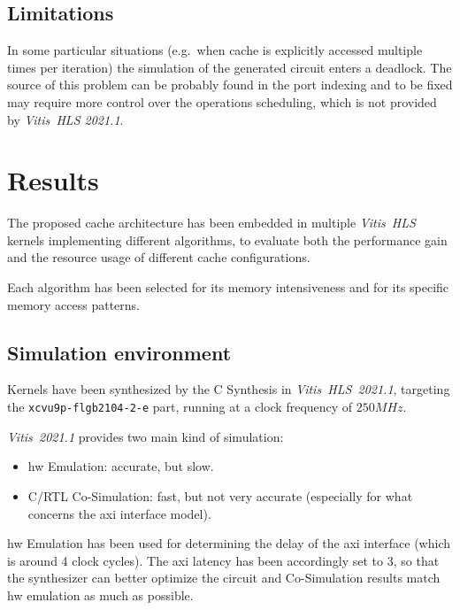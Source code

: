 \documentclass[11pt,a4paper,oneside]{memoir}
\begin{document}
\section{Limitations}
In some particular situations (e.g.\ when cache is explicitly accessed multiple
times per iteration) the simulation of the generated circuit enters a deadlock.
The source of this problem can be probably found in the port indexing and to be
fixed may require more control over the operations scheduling, which is not
provided by \emph{Vitis\texttrademark~HLS 2021.1}.

\chapter{Results}
The proposed cache architecture has been embedded in multiple \emph{Vitis~HLS}
kernels implementing different algorithms, to evaluate both the performance gain
and the resource usage of different cache configurations.

Each algorithm has been selected for its memory intensiveness and for its
specific memory access patterns.

\section{Simulation environment}
Kernels have been synthesized by the C Synthesis in
\emph{Vitis\texttrademark~HLS~2021.1}, targeting the
\texttt{xcvu9p-flgb2104-2-e} part, running at a clock frequency of $250 MHz$.

\emph{Vitis\texttrademark~2021.1} provides two main kind of simulation:
\begin{itemize}
	\item \acl{hw} Emulation: accurate, but slow.
	\item C/RTL Co-Simulation: fast, but not very accurate (especially for
		what concerns the \ac{axi} interface model).
\end{itemize}

\ac{hw} Emulation has been used for determining the delay of the \ac{axi}
interface (which is around 4 clock cycles). 
The \ac{axi} latency has been accordingly set to 3, so that the synthesizer can
better optimize the circuit and Co-Simulation results match \ac{hw} emulation as
much as possible.
\end{document}
